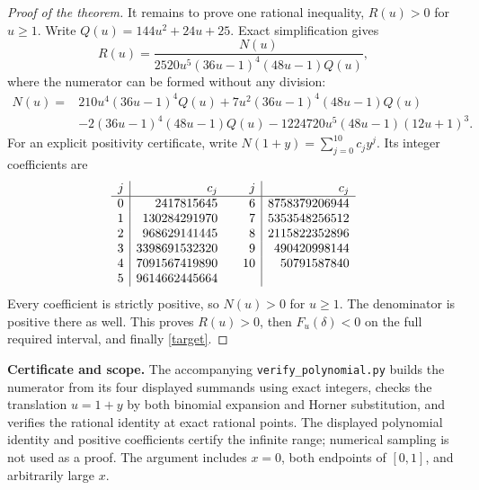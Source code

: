 \documentclass[11pt]{article}
\begin{document}
\begin{proof}[Proof of the theorem]
\newpage
It remains to prove one rational inequality, \(R(u)>0\) for \(u\geq1\).
Write \(Q(u)=144u^2+24u+25\). Exact simplification gives
\[
 R(u)=\frac{N(u)}
 {2520u^5(36u-1)^4(48u-1)Q(u)},
\]
where the numerator can be formed without any division:
\begin{align*}
 N(u)={}&210u^4(36u-1)^4Q(u)
       +7u^2(36u-1)^4(48u-1)Q(u)\\
       &-2(36u-1)^4(48u-1)Q(u)
       -1224720u^5(48u-1)(12u+1)^3.
\end{align*}
For an explicit positivity certificate, write
\(N(1+y)=\sum_{j=0}^{10}c_jy^j\). Its integer coefficients are
\[
\begin{array}{r|r@{\qquad}r|r}
j&c_j&j&c_j\\ \hline
0&2417815645&6&8758379206944\\
1&130284291970&7&5353548256512\\
2&968629141445&8&2115822352896\\
3&3398691532320&9&490420998144\\
4&7091567419890&10&50791587840\\
5&9614662445664&&
\end{array}
\]
Every coefficient is strictly positive, so \(N(u)>0\) for \(u\geq1\).
The denominator is positive there as well. This proves \(R(u)>0\),
then \(F_u(\delta)<0\) on the full required interval, and finally
\eqref{target}.
\end{proof}

\noindent\textbf{Certificate and scope.}
The accompanying \texttt{verify\_polynomial.py} builds the numerator
from its four displayed summands using exact integers, checks the
translation \(u=1+y\) by both binomial expansion and Horner substitution,
and verifies the rational identity at exact rational points.
The displayed polynomial identity and positive coefficients certify
the infinite range; numerical sampling is not used as a proof.
The argument includes \(x=0\), both endpoints of \([0,1]\), and
arbitrarily large \(x\).
\end{document}
